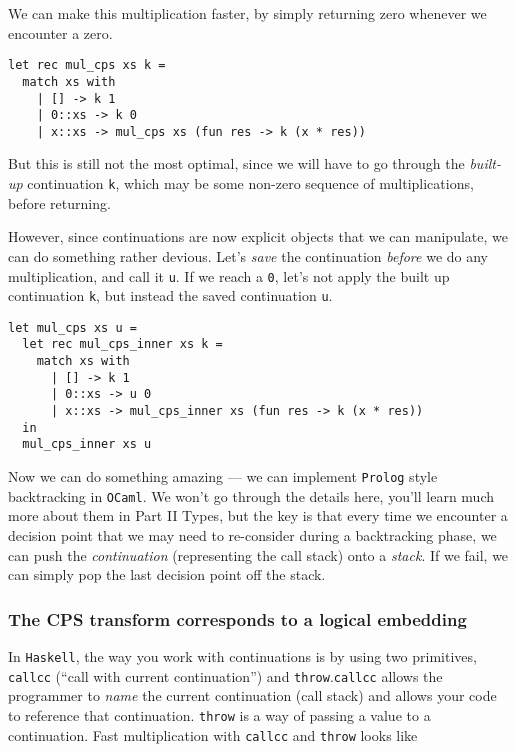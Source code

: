 We can make this multiplication faster, by simply returning zero whenever we encounter a zero. 

\begin{code}
\label{code:mul-ocaml-fastest}
\begin{verbatim}
let rec mul_cps xs k = 
  match xs with
    | [] -> k 1
    | 0::xs -> k 0
    | x::xs -> mul_cps xs (fun res -> k (x * res))
\end{verbatim}
\end{code}

But this is still not the most optimal, since we will have to go through the \emph{built-up} continuation \texttt{k}, which may be some non-zero sequence of multiplications, before returning. 

However, since continuations are now explicit objects that we can manipulate, we can do something rather devious. Let's \emph{save} the continuation \emph{before} we do any multiplication, and call it \texttt{u}. If we reach a \texttt{0}, let's not apply the built up continuation \texttt{k}, but instead the saved continuation \texttt{u}.

\begin{code}
\label{code:fib-ocaml-again}
\begin{verbatim}
let mul_cps xs u = 
  let rec mul_cps_inner xs k = 
    match xs with
      | [] -> k 1
      | 0::xs -> u 0
      | x::xs -> mul_cps_inner xs (fun res -> k (x * res))
  in
  mul_cps_inner xs u
\end{verbatim}
\end{code}

Now we can do something amazing --- we can implement \texttt{Prolog} style backtracking in \texttt{OCaml}. We won't go through the details here, you'll learn much more about them in {\sffamily Part II Types}, but the key is that every time we encounter a decision point that we may need to re-consider during a backtracking phase, we can push the \emph{continuation} (representing the call stack) onto a \emph{stack}. If we fail, we can simply pop the last decision point off the stack. 

\subsubsection{The CPS transform corresponds to a logical embedding}
In \texttt{Haskell}, the way you work with continuations is by using two primitives, \texttt{callcc} (``call with current continuation'') and \texttt{throw}.\texttt{callcc} allows the programmer to \emph{name} the current continuation (call stack) and allows your code to reference that continuation. \texttt{throw} is a way of passing a value to a continuation. Fast multiplication with \texttt{callcc} and \texttt{throw} looks like


